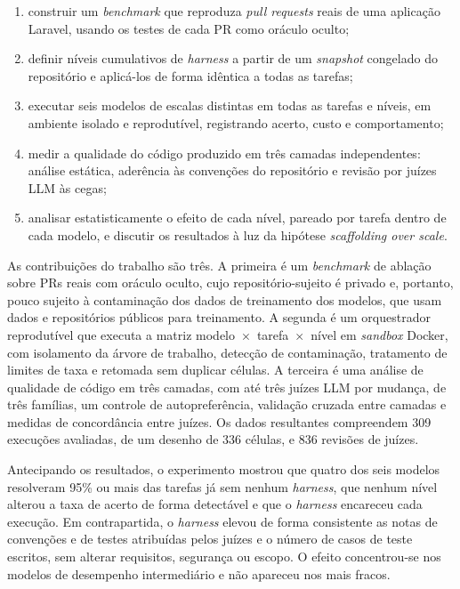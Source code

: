 \begin{enumerate}[nosep]
    \item construir um \textit{benchmark} que reproduza \textit{pull requests}
    reais de uma aplicação Laravel, usando os testes de cada PR como oráculo
    oculto;
    \item definir níveis cumulativos de \textit{harness} a partir de um
    \textit{snapshot} congelado do repositório e aplicá-los de forma idêntica a
    todas as tarefas;
    \item executar seis modelos de escalas distintas em todas as tarefas e
    níveis, em ambiente isolado e reprodutível, registrando acerto, custo e
    comportamento;
    \item medir a qualidade do código produzido em três camadas independentes:
    análise estática, aderência às convenções do repositório e revisão por
    juízes LLM às cegas;
    \item analisar estatisticamente o efeito de cada nível, pareado por tarefa
    dentro de cada modelo, e discutir os resultados à luz da hipótese
    \textit{scaffolding over scale}.
\end{enumerate}

As contribuições do trabalho são três. A primeira é um \textit{benchmark} de
ablação sobre PRs reais com oráculo oculto, cujo repositório-sujeito é privado
e, portanto, pouco sujeito à contaminação dos dados de treinamento dos modelos, que usam dados e repositórios públicos para treinamento.
A segunda é um orquestrador reprodutível que executa a matriz
modelo~$\times$~tarefa~$\times$~nível em \textit{sandbox} Docker, com
isolamento da árvore de trabalho, detecção de contaminação, tratamento de
limites de taxa e retomada sem duplicar células. A terceira é uma análise de
qualidade de código em três camadas, com até três juízes LLM por mudança, de
três famílias, um controle de autopreferência, validação cruzada entre camadas
e medidas de concordância entre juízes. Os dados resultantes compreendem 309
execuções avaliadas, de um desenho de 336 células, e 836 revisões de juízes.

Antecipando os resultados, o experimento mostrou que quatro dos seis modelos
resolveram 95\% ou mais das tarefas já sem nenhum \textit{harness}, que nenhum
nível alterou a taxa de acerto de forma detectável e que o \textit{harness}
encareceu cada execução. Em contrapartida, o \textit{harness} elevou de forma
consistente as notas de convenções e de testes atribuídas pelos juízes e o
número de casos de teste escritos, sem alterar requisitos, segurança ou escopo.
O efeito concentrou-se nos modelos de desempenho intermediário e não apareceu
nos mais fracos.

